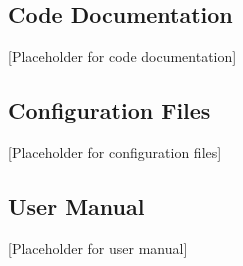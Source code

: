 \documentclass[12pt,a4paper]{article}
\begin{document}

\subsection{Code Documentation}


[Placeholder for code documentation]

\subsection{Configuration Files}


[Placeholder for configuration files]

\subsection{User Manual}


[Placeholder for user manual]
\end{document}
